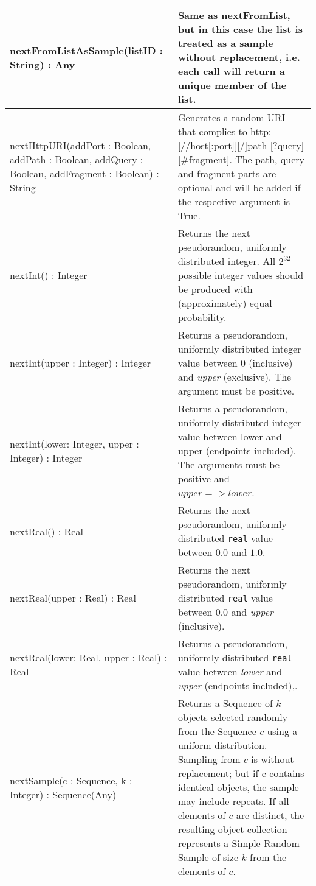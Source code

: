 \begin{longtabu} {|p{6.5cm}|X|}
	nextFromListAsSample(listID : String) : Any & Same as nextFromList, but in this case the list is treated as a sample without replacement, i.e. each call will return a unique member of the list.\\\hline
	
	nextHttpURI(addPort : Boolean, addPath : Boolean, addQuery : Boolean, addFragment : Boolean) : String & Generates a random URI that complies to http:[//host[:port]][/]path [?query][\#fragment]. The path, query and fragment parts are optional and will be added if the respective argument is True.\\\hline
    
    nextInt() : Integer & Returns the next pseudorandom, uniformly distributed integer. All $2^{32}$ possible integer values should be produced with (approximately) equal probability.\\\hline
	
	nextInt(upper : Integer) : Integer & Returns a pseudorandom, uniformly distributed integer value between 0 (inclusive) and \emph{upper} (exclusive). The argument must be positive.\\\hline
	
	nextInt(lower: Integer, upper : Integer) : Integer & Returns a pseudorandom, uniformly distributed integer value between lower and upper (endpoints included). The arguments must be positive and $upper => lower$.\\\hline
    
    nextReal() : Real & Returns the next pseudorandom, uniformly distributed \texttt{real} value between $0.0$ and $1.0$.\\\hline
    
    nextReal(upper : Real) : Real & Returns the next pseudorandom, uniformly distributed \texttt{real} value between $0.0$ and \emph{upper} (inclusive).\\\hline
    
    nextReal(lower: Real, upper : Real) : Real & Returns a pseudorandom, uniformly distributed \texttt{real} value between \emph{lower} and \emph{upper} (endpoints included),.\\\hline
    
	nextSample(c : Sequence, k : Integer) : Sequence(Any) & Returns a Sequence of $k$ objects selected randomly from the Sequence $c$ using a uniform distribution.  Sampling from $c$ is without replacement; but if c contains identical objects, the sample may include repeats. If all elements of $c$ are distinct, the resulting object collection represents a Simple Random Sample of size $k$ from the elements of $c$.\\\hline
	

\end{longtabu}
